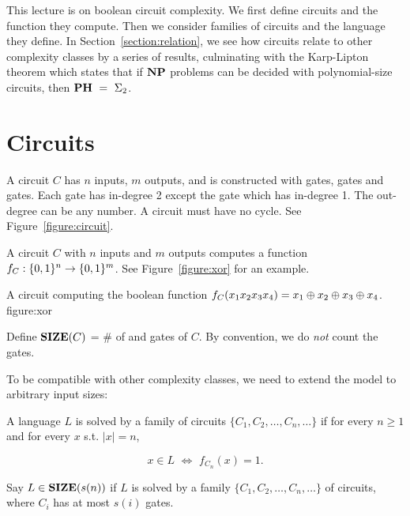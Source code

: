 









This lecture is on boolean circuit complexity. We first define circuits and the function they compute. Then we consider families of circuits and the language they define. In Section~\ref{section:relation}, we see how circuits relate to other complexity classes by a series of results, culminating with the Karp-Lipton theorem which states that if $\np$ problems can be decided with polynomial-size circuits, then $\ph~=~\sigmatwo$.

\section{Circuits}

A circuit $C$ has $n$ inputs, $m$ outputs, and is constructed with \scand{} gates, \scor{} gates and \scnot{} gates. Each gate has in-degree 2 except the \scnot{} gate which has in-degree 1. The out-degree can be any number. A circuit must have no cycle. See Figure~\ref{figure:circuit}.


A circuit $C$ with $n$ inputs and $m$ outputs computes a function $f_C:\{0,1\}^n \to \{0,1\}^m$. See Figure~\ref{figure:xor} for an example.

%
{A circuit computing the boolean 
function $f_C(x_1 x_2 x_3 x_4) = x_1 \oplus x_2 \oplus x_3 \oplus x_4$.}
{figure:xor}


Define $\size(C)$ = \# of \scand{} and \scor{} gates of $C$. By convention, we do \emph{not} count the \scnot{} gates.

To be compatible with other complexity classes, we need to extend the model to arbitrary input sizes:

\begin{Def}
A language $L$ is solved by a family of circuits $\{C_1, C_2, \ldots, C_n, \ldots\}$ if for every $n \geq 1$ and for every $x$ s.t. $|x| = n$,

\begin{displaymath}
x \in L \,\, \iff \,\, f_{C_n}(x)=1.
\end{displaymath}
\end{Def}

\begin{Def}
Say $L \in \size(s(n))$ if $L$ is solved by a family $\{C_1, C_2, \ldots, C_n, \ldots\}$ of circuits, where $C_i$ has at most $s(i)$ gates.
\end{Def}

